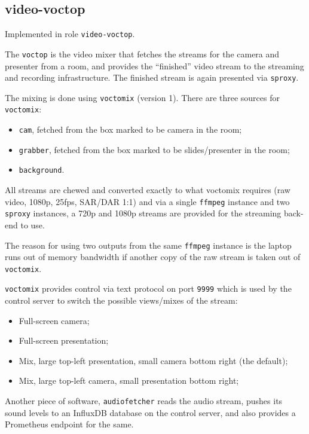 \documentclass{article}
\begin{document}
\subsection{video-voctop}

Implemented in role \texttt{video-voctop}.

The \texttt{voctop} is the video mixer that fetches the streams for the camera and presenter from a room, and provides the ``finished'' video stream to the streaming and recording infrastructure. The finished stream is again presented via \texttt{sproxy}.

The mixing is done using \texttt{voctomix} (version 1). There are three sources for \texttt{voctomix}:

\begin{itemize}
  \item \texttt{cam}, fetched from the box marked to be camera in the room;
  \item \texttt{grabber}, fetched from the box marked to be slides/presenter in the room;
  \item \texttt{background}.
\end{itemize}

All streams are chewed and converted exactly to what voctomix requires (raw video, 1080p, 25fps, SAR/DAR 1:1) and via a single \texttt{ffmpeg} instance and two \texttt{sproxy} instances, a 720p and 1080p streams are provided for the streaming back-end to use.

The reason for using two outputs from the same \texttt{ffmpeg} instance is the laptop runs out of memory bandwidth if another copy of the raw stream is taken out of \texttt{voctomix}.

\texttt{voctomix} provides control via text protocol on port \texttt{9999} which is used by the control server to switch the possible views/mixes of the stream:

\begin{itemize}
  \item Full-screen camera;
  \item Full-screen presentation;
  \item Mix, large top-left presentation, small camera bottom right (the default);
  \item Mix, large top-left camera, small presentation bottom right;
\end{itemize}

Another piece of software, \texttt{audiofetcher} reads the audio stream, pushes its sound levels to an InfluxDB database on the control server, and also provides a Prometheus endpoint for the same.
\end{document}

